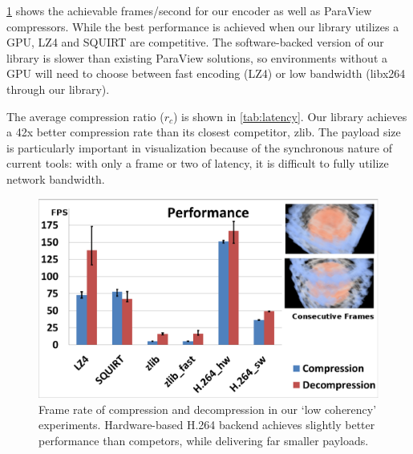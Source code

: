 \documentclass[review]{vgtc}                 %
\begin{document}

\cref{fig:time} shows the achievable frames/second for our encoder as
well as ParaView compressors.  While the best performance is achieved
when our library utilizes a GPU, LZ4 and SQUIRT are competitive.  The
software-backed version of our library is slower than existing ParaView
solutions, so environments without a GPU will need to choose between
fast encoding (LZ4) or low bandwidth (libx264 through our library).

The average compression ratio (\(r_c\)) is shown
in \cref{tab:latency}.  Our library achieves a 42x better compression
rate than its closest competitor, zlib.  The payload size is
particularly important in visualization because of the synchronous
nature of current tools: with only a frame or two of latency, it is
difficult to fully utilize network bandwidth.

%

\begin{figure}[t]
  \centering
  \includegraphics[width=\columnwidth]{Performance.eps}
  \caption{Frame rate of compression and decompression in our `low
  coherency' experiments. Hardware-based H.264 backend achieves
  slightly better performance than competors, while delivering far
  smaller payloads.}
  \label{fig:time}
\end{figure}
\end{document}
